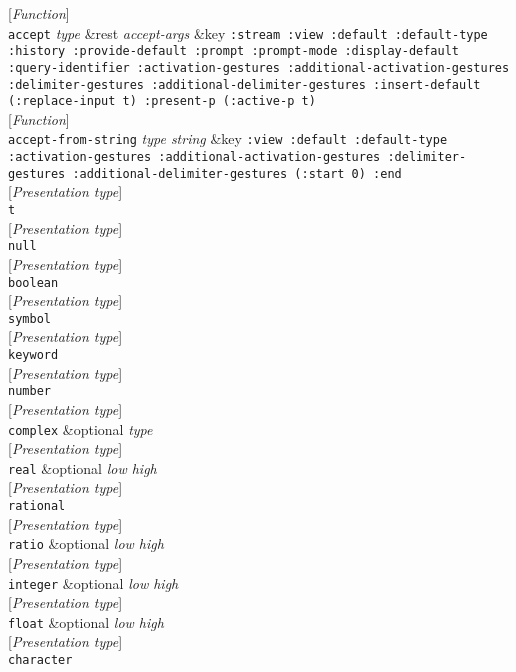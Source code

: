 \documentclass[10pt]{book}
\newenvironment{defother}[2]{[\textit{#1}]\\\texttt{#2}}{\\}
\newenvironment{defun}[1]{\begin{defother}{Function}{#1}}{\end{defother}}
\begin{document}
\begin{defun}{accept} \textit{type} \&rest \textit{accept-args} \&key \texttt{:stream :view :default :default-type :history :provide-default :prompt :prompt-mode :display-default :query-identifier :activation-gestures :additional-activation-gestures :delimiter-gestures :additional-delimiter-gestures :insert-default (:replace-input t) :present-p (:active-p t)}\end{defun}
\begin{defun}{accept-from-string} \textit{type string} \&key \texttt{:view :default :default-type :activation-gestures :additional-activation-gestures :delimiter-gestures :additional-delimiter-gestures (:start 0) :end}\end{defun}
\begin{defother}{Presentation type}{t}\end{defother}
\begin{defother}{Presentation type}{null}\end{defother} %
\begin{defother}{Presentation type}{boolean}\end{defother} 
\begin{defother}{Presentation type}{symbol}\end{defother}
\begin{defother}{Presentation type}{keyword}\end{defother}
\begin{defother}{Presentation type}{number}\end{defother}
\begin{defother}{Presentation type}{complex} \&optional \textit{type} \end{defother}
\begin{defother}{Presentation type}{real} \&optional \textit{low high}\end{defother}
\begin{defother}{Presentation type}{rational}\end{defother}
\begin{defother}{Presentation type}{ratio} \&optional \textit{low high}\end{defother}
\begin{defother}{Presentation type}{integer} \&optional \textit{low high}\end{defother}
\begin{defother}{Presentation type}{float} \&optional \textit{low high} \end{defother}
\begin{defother}{Presentation type}{character}\end{defother}
\end{document}
